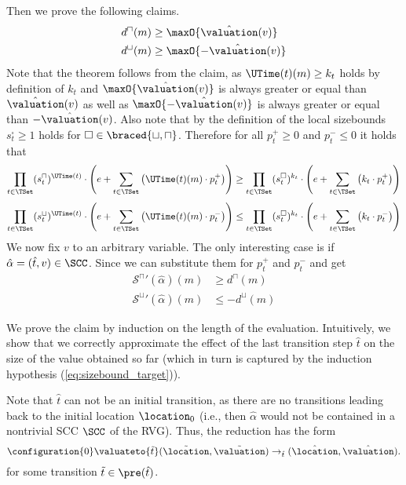 Then we prove the following claims.
\begin{equation} \label{eq:sizebound_hypothesis}
  \begin{split}
    d^\sqcap(m) & \geq \maxO{\hat{\valuation}(v)} \\
    d^\sqcup(m) & \geq \maxO{-\hat{\valuation}(v)}
  \end{split}
\end{equation}
Note that the theorem follows from the claim, as $\UTime(t)(m) \geq k_t$ holds by definition of $k_t$ and $\maxO{\hat{\valuation}(v)}$ is always greater or equal than $\hat{\valuation}(v)$ as well as $\maxO{-\hat{\valuation}(v)}$ is always greater or equal than $-\hat{\valuation}(v)$.
Also note that by the definition of the local sizebounds $s^\square_t \geq 1$ holds for $\square \in \braced{\sqcup, \sqcap}$.
Therefore for all $p^+_t \geq 0$ and $p^-_t \leq 0$ it holds that
\[ \prod_{t \in \TSet} (s^\sqcap_t)^{\UTime(t)} \cdot \left( e + \sum_{t \in \TSet} \left( \UTime(t)(m) \cdot p^+_t \right) \right) \geq \prod_{t \in \TSet} (s^\square_t)^{k_t} \cdot \left( e + \sum_{t \in \TSet} \left( k_t \cdot p^+_t \right) \right) \]
\[ \prod_{t \in \TSet} (s^\sqcup_t)^{\UTime(t)} \cdot \left( e + \sum_{t \in \TSet} \left( \UTime(t)(m) \cdot p^-_t \right) \right) \leq \prod_{t \in \TSet} (s^\square_t)^{k_t} \cdot \left( e + \sum_{t \in \TSet} \left( k_t \cdot p^-_t \right) \right) \]
We now fix $v$ to an arbitrary variable.
The only interesting case is if $\hat{\alpha} = (\hat{t}, v) \in \SCC$.
Since  we can substitute them for $p^+_t$ and $p^-_t$ and get
\begin{equation}
  \begin{split}
    {\mathcal{S}^\sqcap}'(\hat{\alpha})(m) & \geq d^\sqcap(m) \\
    {\mathcal{S}^\sqcup}'(\hat{\alpha})(m) & \leq -d^\sqcup(m)
  \end{split}
\end{equation}

We prove the claim by induction on the length of the evaluation.
Intuitively, we show that we correctly approximate the effect of the last transition step $\hat{t}$ on the size of the value obtained so far (which in turn is captured by the induction hypothesis (\ref{eq:sizebound_target})).

Note that $\hat{t}$ can not be an initial transition, as there are no transitions leading back to the initial location $\location_0$
(i.e., then $\hat{\alpha}$ would not be contained in a nontrivial SCC $\SCC$ of the RVG).
Thus, the reduction has the form
\[ \configuration{0} \valuateto{\tilde{t}} (\tilde{\location}, \tilde{\valuation}) \rightarrow_{\hat{t}} (\hat{\location}, \hat{\valuation}). \]
for some transition $\tilde{t} \in \pre(\hat{t})$.

